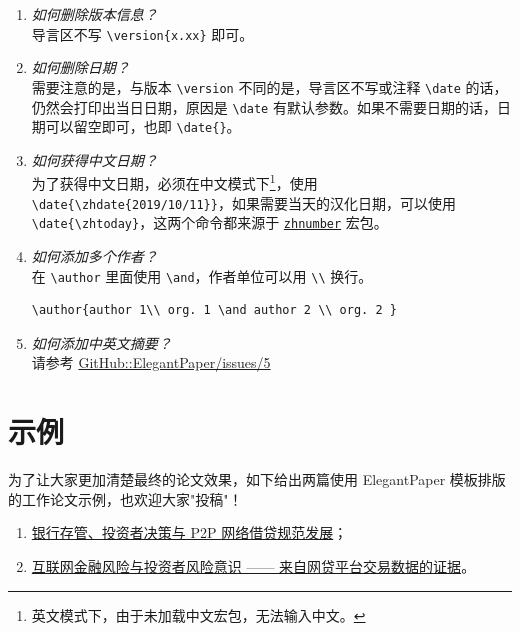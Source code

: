 \documentclass[lang=cn,11pt,a4paper,cite=authoryear]{elegantpaper}
\begin{document}
\begin{enumerate}[label=\arabic*).]
  \item \textit{如何删除版本信息？}\\
      导言区不写 \lstinline|\version{x.xx}| 即可。
  \item \textit{如何删除日期？}\\
      需要注意的是，与版本 \lstinline{\version} 不同的是，导言区不写或注释 \lstinline{\date} 的话，仍然会打印出当日日期，原因是 \lstinline{\date} 有默认参数。如果不需要日期的话，日期可以留空即可，也即 \lstinline|\date{}|。
  \item \textit{如何获得中文日期？}\\
      为了获得中文日期，必须在中文模式下\footnote{英文模式下，由于未加载中文宏包，无法输入中文。}，使用 \lstinline|\date{\zhdate{2019/10/11}}|，如果需要当天的汉化日期，可以使用 \lstinline|\date{\zhtoday}|，这两个命令都来源于 \href{https://ctan.org/pkg/zhnumber}{\lstinline{zhnumber}} 宏包。
  \item \textit{如何添加多个作者？}\\
      在 \lstinline{\author} 里面使用 \lstinline{\and}，作者单位可以用 \lstinline{\\} 换行。\begin{lstlisting}
\author{author 1\\ org. 1 \and author 2 \\ org. 2 }
\end{lstlisting}
  \item \textit{如何添加中英文摘要？}\\
      请参考 \href{https://github.com/ElegantLaTeX/ElegantPaper/issues/5}{GitHub::ElegantPaper/issues/5}
\end{enumerate}

\section{示例}

为了让大家更加清楚最终的论文效果，如下给出两篇使用 ElegantPaper 模板排版的工作论文示例，也欢迎大家"投稿"！

\begin{enumerate}
  \item \href{https://github.com/EthanDeng/bank-custody}{银行存管、投资者决策与 P2P 网络借贷规范发展}；
  \item \href{https://github.com/EthanDeng/risk-awareness}{互联网金融风险与投资者风险意识 —— 来自网贷平台交易数据的证据}。
\end{enumerate}
\end{document}
